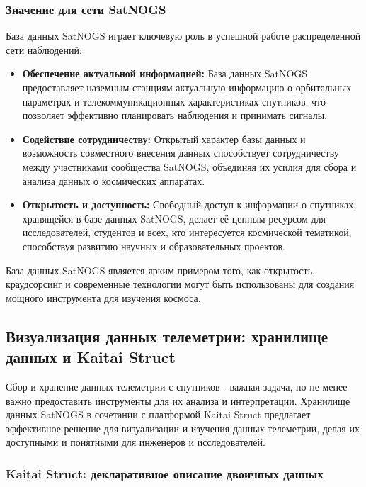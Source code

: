 \documentclass[12pt, a4paper]{extreport}
\begin{document}
\subsubsection{Значение для сети SatNOGS}

База данных SatNOGS играет ключевую роль в успешной работе распределенной сети наблюдений:

\begin{itemize}
    \item \textbf{Обеспечение актуальной информацией:} База данных SatNOGS предоставляет наземным станциям актуальную информацию о орбитальных параметрах и телекоммуникационных характеристиках спутников, что позволяет эффективно планировать наблюдения и принимать сигналы.
    \item \textbf{Содействие сотрудничеству:} Открытый характер базы данных и возможность совместного внесения данных способствует сотрудничеству между участниками сообщества SatNOGS, объединяя их усилия для сбора и анализа данных о космических аппаратах.
    \item \textbf{Открытость и доступность:} Свободный доступ к информации о спутниках, хранящейся в базе данных SatNOGS, делает её ценным ресурсом для исследователей, студентов и всех, кто интересуется космической тематикой, способствуя развитию научных и образовательных проектов.
\end{itemize}

База данных SatNOGS является ярким примером того, как открытость, краудсорсинг и современные технологии могут быть использованы для создания мощного инструмента для изучения космоса.

\subsection{Визуализация данных телеметрии: хранилище данных и Kaitai Struct}

Сбор и хранение данных телеметрии с  спутников - важная задача, но не менее важно  предоставить инструменты для их анализа и интерпретации.  Хранилище данных SatNOGS в сочетании с платформой Kaitai Struct предлагает  эффективное решение для визуализации и изучения данных телеметрии, делая их доступными и понятными для инженеров и исследователей.

\subsubsection{Kaitai Struct: декларативное описание двоичных данных}
\end{document}
